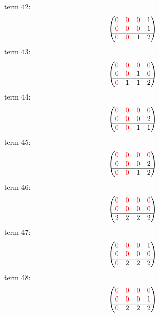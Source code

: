 \documentclass{article}
\begin{document}
term 42:
$$\begin{pmatrix}{\color{red} 0} & {\color{red} 0} & {\color{red} 0} & 1\\
{\color{red} 0} & {\color{red} 0} & {\color{red} 0} & 1\\
\hline{\color{red} 0} & {\color{red} 0} & 1 & 2\\
\end{pmatrix}$$
term 43:
$$\begin{pmatrix}{\color{red} 0} & {\color{red} 0} & {\color{red} 0} & {\color{red} 0}\\
{\color{red} 0} & {\color{red} 0} & 1 & {\color{red} 0}\\
\hline{\color{red} 0} & 1 & 1 & 2\\
\end{pmatrix}$$
term 44:
$$\begin{pmatrix}{\color{red} 0} & {\color{red} 0} & {\color{red} 0} & {\color{red} 0}\\
{\color{red} 0} & {\color{red} 0} & {\color{red} 0} & 2\\
\hline{\color{red} 0} & {\color{red} 0} & 1 & 1\\
\end{pmatrix}$$
term 45:
$$\begin{pmatrix}{\color{red} 0} & {\color{red} 0} & {\color{red} 0} & {\color{red} 0}\\
{\color{red} 0} & {\color{red} 0} & {\color{red} 0} & 2\\
\hline{\color{red} 0} & {\color{red} 0} & 1 & 2\\
\end{pmatrix}$$
term 46:
$$\begin{pmatrix}{\color{red} 0} & {\color{red} 0} & {\color{red} 0} & {\color{red} 0}\\
{\color{red} 0} & {\color{red} 0} & {\color{red} 0} & {\color{red} 0}\\
\hline2 & 2 & 2 & 2\\
\end{pmatrix}$$
term 47:
$$\begin{pmatrix}{\color{red} 0} & {\color{red} 0} & {\color{red} 0} & 1\\
{\color{red} 0} & {\color{red} 0} & {\color{red} 0} & {\color{red} 0}\\
\hline{\color{red} 0} & 2 & 2 & 2\\
\end{pmatrix}$$
term 48:
$$\begin{pmatrix}{\color{red} 0} & {\color{red} 0} & {\color{red} 0} & {\color{red} 0}\\
{\color{red} 0} & {\color{red} 0} & {\color{red} 0} & 1\\
\hline{\color{red} 0} & 2 & 2 & 2\\
\end{pmatrix}$$
\end{document}
